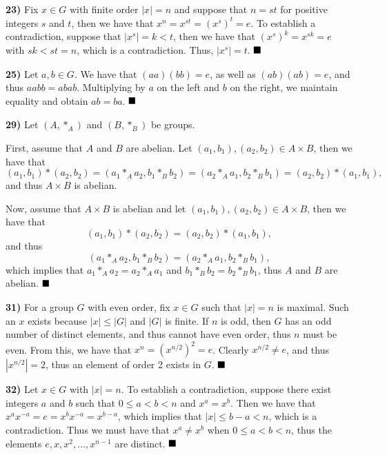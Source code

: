 \documentclass[12pt]{article}
\newcommand{\parenb}[1]{\left(#1\right)}
\newcommand{\vertb}[1]{\left\vert#1\right\vert}
\newcommand{\done}{\ensuremath{\strut\hfill\blacksquare}}
\begin{document}
\textbf{23)}
Fix \( x \in G \) with finite order \( \vertb{x} = n \) and suppose that
\( n = st \) for positive integers \( s \) and \( t \), then we have that
\( x^n = x^{st} = \parenb{x^s}^t = e \).
To establish a contradiction, suppose that \( \vertb{x^s} = k < t \), then we
have that \( \parenb{x^s}^k = x^{sk} = e \) with \( sk < st = n \), which is a
contradiction.
Thus, \( \vertb{x^s} = t \).
\done

\textbf{25)}
Let \( a, b \in G \).
We have that \( (aa)(bb) = e \), as well as \( (ab)(ab) = e \), and thus
\( aabb = abab \).
Multiplying by \( a \) on the left and \( b \) on the right, we maintain
equality and obtain \( ab = ba \).
\done

\textbf{29)}
Let \( \parenb{A, *_A} \) and \( \parenb{B, *_B} \) be groups.

First, assume that \( A \) and \( B \) are abelian.
Let \( (a_1, b_1), (a_2, b_2) \in A \times B \), then we have that
\[
	(a_1, b_1) * (a_2, b_2)
	= (a_1 *_A a_2, b_1 *_B b_2)
	= (a_2 *_A a_1, b_2 *_B b_1)
	= (a_2, b_2) * (a_1, b_1),
\]
and thus \( A \times B \) is abelian.

Now, assume that \( A \times B \) is abelian and let
\( (a_1, b_1), (a_2, b_2) \in A \times B \), then we have that
\[
	(a_1, b_1) * (a_2, b_2)
	= (a_2, b_2) * (a_1, b_1),
\]
and thus
\[
	(a_1 *_A a_2, b_1 *_B b_2)
	= (a_2 *_A a_1, b_2 *_B b_1),
\]
which implies that \( a_1 *_A a_2 = a_2 *_A a_1 \) and
\( b_1 *_B b_2 = b_2 *_B b_1 \), thus \( A \) and \( B \) are abelian.
\done

\pagebreak
\textbf{31)}
For a group \( G \) with even order, fix \( x \in G \) such that
\( \vertb{x} = n \) is maximal.
Such an \( x \) exists because \( \vertb{x} \leq \vertb{G} \) and
\( \vertb{G} \) is finite.
If \( n \) is odd, then \( G \) has an odd number of distinct elements, and
thus cannot have even order, thus \( n \) must be even.
From this, we have that \( x^n = (x^{n / 2})^2 = e \).
Clearly \( x^{n / 2} \ne e \), and thus \( \vertb{x^{n / 2}} = 2 \), thus an
element of order 2 exists in \( G \).
\done

\textbf{32)}
Let \( x \in G \) with \( \vertb{x} = n \).
To establish a contradiction, suppose there exist integers \( a \) and \( b \)
such that \( 0 \leq a < b < n \) and \( x^a = x^b \).
Then we have that \( x^ax^{-a} = e = x^bx^{-a} = x^{b - a} \), which implies
that \( \vertb{x} \leq b - a < n \), which is a contradiction.
Thus we must have that \( x^a \ne x^b \) when \( 0 \leq a < b < n \), thus the
elements \( e, x, x^2, \dots, x^{n - 1} \) are distinct.
\done
\end{document}
